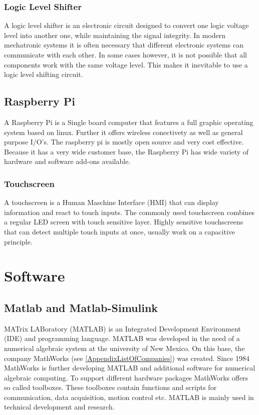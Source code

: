 \subsubsection{Logic Level Shifter}
A logic level shifter is an electronic circuit designed to convert one logic voltage level into another one, while maintaining the signal integrity. In modern mechatronic systems it is often necessary 
that different electronic systems can communicate with each other. In some cases however, it is not possible that all components work with the same voltage level. This makes it inevitable to use a logic level shifting circuit.


\subsection{Raspberry Pi}
A Raspberry Pi is a Single board computer that features a full graphic operating system based on linux. Further it offers wireless conectivety as well as general purpose I/O's. The raspberry pi is mostly open source and very cost effective.
Because it has a very wide customer base, the Raspberry Pi has wide variety of hardware and software add-ons available.\cite{RaspberryPiFoundation}

\subsubsection{Touchscreen}
A touchscreen is a Human Maschine Interface (HMI) that can display information and react to touch inputs. The commonly used touchscreen combines a regular LED screen with touch sensitive layer. 
Highly sensitive touchscreens that can detect multiple touch inputs at once, usually work on a capacitive principle. 

\section{Software}
\subsection{Matlab and Matlab-Simulink}
MATrix LABoratory (MATLAB) is an Integrated Development Environment (IDE)
and programming language. MATLAB was developed in the need of a numerical algebraic
system at the university of New Mexico. On this base, the company MathWorks (see
\ref{AppendixListOfCompanies}) was created. Since 1984 MathWorks is further developing MATLAB and
additional software for numerical algebraic computing. To support different hardware
packages MathWorks offers so called toolboxes. These toolboxes contain functions and
scripts for communication, data acquisition, motion control etc.
MATLAB is mainly used in technical development and research.\cite{Mathworks}

